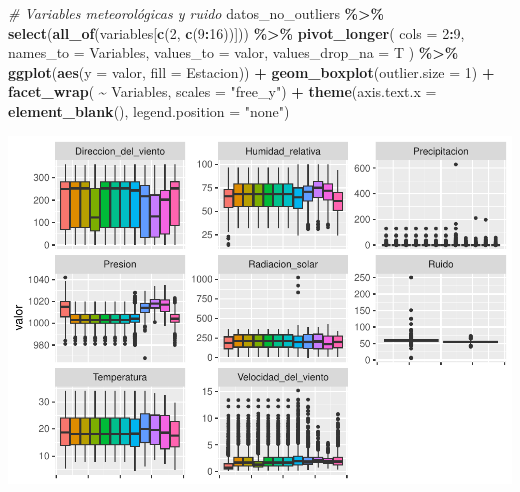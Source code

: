 \documentclass[notspecified,article,submit,moreauthors,pdftex]{Definitions/mdpi}
\newenvironment{Shaded}{\begin{snugshade}}{\end{snugshade}}
\newcommand{\AttributeTok}[1]{\textcolor[rgb]{0.13,0.29,0.53}{#1}}
\newcommand{\CommentTok}[1]{\textcolor[rgb]{0.56,0.35,0.01}{\textit{#1}}}
\newcommand{\DecValTok}[1]{\textcolor[rgb]{0.00,0.00,0.81}{#1}}
\newcommand{\FunctionTok}[1]{\textcolor[rgb]{0.13,0.29,0.53}{\textbf{#1}}}
\newcommand{\NormalTok}[1]{#1}
\newcommand{\SpecialCharTok}[1]{\textcolor[rgb]{0.81,0.36,0.00}{\textbf{#1}}}
\newcommand{\StringTok}[1]{\textcolor[rgb]{0.31,0.60,0.02}{#1}}
\begin{document}
\begin{Shaded}
\begin{Highlighting}[]
\CommentTok{\# Variables meteorológicas y ruido}
\NormalTok{datos\_no\_outliers }\SpecialCharTok{\%\textgreater{}\%}
  \FunctionTok{select}\NormalTok{(}\FunctionTok{all\_of}\NormalTok{(variables[}\FunctionTok{c}\NormalTok{(}\DecValTok{2}\NormalTok{, }\FunctionTok{c}\NormalTok{(}\DecValTok{9}\SpecialCharTok{:}\DecValTok{16}\NormalTok{))])) }\SpecialCharTok{\%\textgreater{}\%}
  \FunctionTok{pivot\_longer}\NormalTok{(}
    \AttributeTok{cols =} \DecValTok{2}\SpecialCharTok{:}\DecValTok{9}\NormalTok{,}
    \AttributeTok{names\_to =} \StringTok{\textquotesingle{}Variables\textquotesingle{}}\NormalTok{,}
    \AttributeTok{values\_to =} \StringTok{\textquotesingle{}valor\textquotesingle{}}\NormalTok{,}
    \AttributeTok{values\_drop\_na =}\NormalTok{ T}
\NormalTok{  ) }\SpecialCharTok{\%\textgreater{}\%}
  \FunctionTok{ggplot}\NormalTok{(}\FunctionTok{aes}\NormalTok{(}\AttributeTok{y =}\NormalTok{ valor, }\AttributeTok{fill =}\NormalTok{ Estacion)) }\SpecialCharTok{+}
  \FunctionTok{geom\_boxplot}\NormalTok{(}\AttributeTok{outlier.size =} \DecValTok{1}\NormalTok{) }\SpecialCharTok{+}
  \FunctionTok{facet\_wrap}\NormalTok{( }\SpecialCharTok{\textasciitilde{}}\NormalTok{ Variables, }\AttributeTok{scales =} \StringTok{"free\_y"}\NormalTok{) }\SpecialCharTok{+}
  \FunctionTok{theme}\NormalTok{(}\AttributeTok{axis.text.x =} \FunctionTok{element\_blank}\NormalTok{(), }\AttributeTok{legend.position =} \StringTok{"none"}\NormalTok{)}
\end{Highlighting}
\end{Shaded}

\includegraphics{Memoria_files/figure-latex/unnamed-chunk-20-1.pdf}
\end{document}
